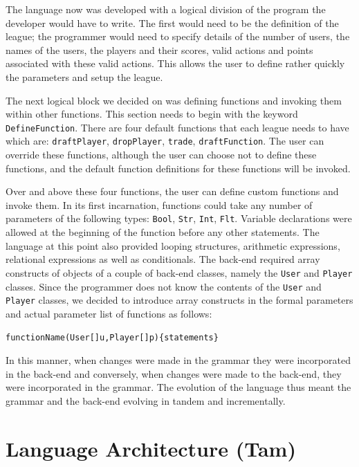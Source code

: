 \documentclass[12pt]{report}
\begin{document}
The language now was developed with a logical division of the program the developer would have to write. The first would need to be the definition of the league; the programmer would need to specify details of the number of users, the names of the users, the players and their scores, valid actions and points associated with these valid actions. This allows the user to define rather quickly the parameters and setup the league.

The next logical block we decided on was defining functions and invoking them within other functions. This section needs to begin with the keyword \texttt{DefineFunction}. There are four default functions that each league needs to have which are: \texttt{draftPlayer}, \texttt{dropPlayer}, \texttt{trade}, \texttt{draftFunction}. The user can override these functions, although the user can choose not to define these functions, and the default function definitions for these functions will be invoked. 

Over and above these four functions, the user can define custom functions and invoke them. In its first incarnation, functions could take any number of parameters of the following types: \texttt{Bool}, \texttt{Str}, \texttt{Int}, \texttt{Flt}. Variable declarations were allowed at the beginning of the function before any other statements. The language at this point also provided looping structures, arithmetic expressions, relational expressions as well as conditionals. The back-end required array constructs of objects of a couple of back-end classes, namely the \texttt{User} and \texttt{Player} classes. Since the programmer does not know the contents of the \texttt{User} and \texttt{Player} classes, we decided to introduce array constructs in the formal parameters and actual parameter list of functions as follows:

\begin{alltt}\begin{singlespace}
         functionName(User[] u,Player[] p) \{ statements \}\end{singlespace}
\end{alltt}

In this manner, when changes were made in the grammar they were incorporated in the back-end and conversely, when changes were made to the back-end, they were incorporated in the grammar. The evolution of the language thus meant the grammar and the back-end evolving in tandem and incrementally.

\chapter{Language Architecture (Tam)}
\end{document}
